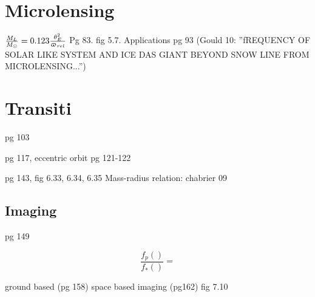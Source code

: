 \section{Microlensing}
\begin{workout}[Microlensing]
$\frac{M_L}{M_{\odot}{}}=0.123\frac{\theta_E^2}{\upvarpi_{rel}}$
Pg 83. fig 5.7. Applications pg 93
(Gould 10: ''fREQUENCY OF SOLAR LIKE SYSTEM AND ICE DAS GIANT BEYOND SNOW LINE FROM MICROLENSING...'')
\end{workout}
\section{Transiti}
pg 103
\begin{workout}
pg 117, eccentric orbit pg 121-122
\end{workout}
\begin{workout}
pg 143, fig 6.33, 6.34, 6.35
Mass-radius relation: chabrier 09
\end{workout}

\subsection{Imaging}
pg 149
\begin{workout}
\begin{equation*}
\frac{f_p()}{f_*()}=
\end{equation*}
\end{workout}
\begin{workout}
ground based (pg 158) space based imaging (pg162)
fig 7.10
\end{workout}


